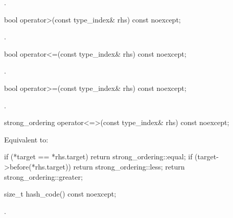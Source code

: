 \begin{itemdescr}
\pnum
\returns
{}.
\end{itemdescr}

%
\begin{itemdecl}
bool operator>(const type_index& rhs) const noexcept;
\end{itemdecl}

\begin{itemdescr}
\pnum
\returns
{}.
\end{itemdescr}

%
\begin{itemdecl}
bool operator<=(const type_index& rhs) const noexcept;
\end{itemdecl}

\begin{itemdescr}
\pnum
\returns
{}.
\end{itemdescr}

%
\begin{itemdecl}
bool operator>=(const type_index& rhs) const noexcept;
\end{itemdecl}

\begin{itemdescr}
\pnum
\returns
{}.
\end{itemdescr}

%
\begin{itemdecl}
strong_ordering operator<=>(const type_index& rhs) const noexcept;
\end{itemdecl}

\begin{itemdescr}
\pnum
\effects
Equivalent to:
\begin{codeblock}
if (*target == *rhs.target) return strong_ordering::equal;
if (target->before(*rhs.target)) return strong_ordering::less;
return strong_ordering::greater;
\end{codeblock}
\end{itemdescr}

%
\begin{itemdecl}
size_t hash_code() const noexcept;
\end{itemdecl}

\begin{itemdescr}
\pnum
\returns
{}.
\end{itemdescr}


